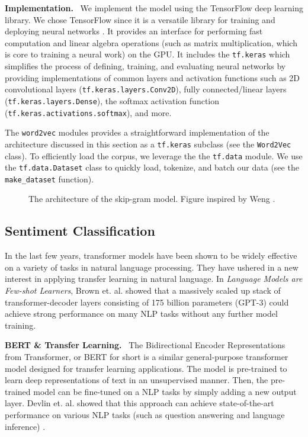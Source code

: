 \documentclass{paper}
\newcommand{\inlineSection}[1]{\vspace{0.5em}\noindent\textbf{#1.}~}
\begin{document}
\inlineSection{Implementation} We implement the model using the TensorFlow deep learning library. We chose TensorFlow since it is a versatile library for training and deploying neural networks \cite{tensorflow2015-whitepaper}. It provides an interface for performing fast computation and linear algebra operations (such as matrix multiplication, which is core to training a neural work) on the GPU. It includes the \texttt{tf.keras} which simplifies the process of defining, training, and evaluating neural networks by providing implementations of common layers and activation functions such as 2D convolutional layers (\texttt{tf.keras.layers.Conv2D}), fully connected/linear layers (\texttt{tf.keras.layers.Dense}), the softmax activation function (\texttt{tf.keras.activations.softmax}), and more.

The \texttt{word2vec} modules provides a straightforward implementation of the architecture discussed in this section as a \texttt{tf.keras} subclass (see the \texttt{Word2Vec} class). To efficiently load the corpus, we leverage the the \texttt{tf.data} module. We use the \texttt{tf.data.Dataset} class to quickly load, tokenize, and batch our data (see the \texttt{make\_dataset} function).

\begin{figure}[ht]
    \centering
    
    \caption{The architecture of the skip-gram model. Figure inspired by Weng \cite{weng_learning_embeddings}.}
    \label{fig:skipgram_architecture}
\end{figure}

\subsection{Sentiment Classification}
In the last few years, transformer models have been shown to be widely effective on a variety of tasks in natural language processing. They have ushered in a new interest in applying transfer learning in natural language. In \textit{Language Models are Few-shot Learners}, Brown et. al. showed that a massively scaled up stack of transformer-decoder layers consisting of 175 billion parameters (GPT-3) could achieve strong performance on many NLP tasks without any further model training.

\inlineSection{BERT \& Transfer Learning} The Bidirectional Encoder Representations from Transformer, or BERT for short is a similar general-purpose transformer model designed for transfer learning applications. The model is pre-trained to learn deep representations of text in an unsupervised manner. Then, the pre-trained model can be fine-tuned on a NLP tasks by simply adding a new output layer. Devlin et. al. showed that this approach can achieve state-of-the-art performance on various NLP tasks (such as question answering and language inference) \cite{devlin2019bert}.
\end{document}

